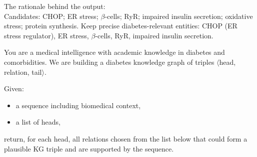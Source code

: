 \documentclass[10pt]{article}
\begin{document}
\begin{appendices}
\begin{tcolorbox}
The rationale behind the output:\\
Candidates: CHOP; ER stress; $\beta$-cells; RyR; impaired insulin secretion; oxidative stress; protein synthesis. Keep precise diabetes-relevant entities: CHOP (ER stress regulator), ER stress, $\beta$-cells, RyR, impaired insulin secretion.

\end{tcolorbox}




\begin{tcolorbox}[
    title=Relation Matching Prompt,
    halign title=center,
    colback=white,        %
    colframe=blue,        %
    breakable,
    boxrule=0.8pt,        %
    arc=4mm,              %
    left=4pt,             %
    right=4pt,            %
    top=4pt,              %
    bottom=4pt,           %
    fontupper=\small
]

You are a medical intelligence with academic knowledge in diabetes and comorbidities.  
We are building a diabetes knowledge graph of triples $\langle$head, relation, tail$\rangle$.  

\vspace{\baselineskip}

Given:
\begin{itemize}
  \item a sequence including biomedical context,
  \item a list of heads,
\end{itemize}
return, for each head, all relations chosen from the list below that could form a plausible KG triple and are supported by the sequence.  

\vspace{\baselineskip}


\end{tcolorbox}
\end{appendices}
\end{document}
